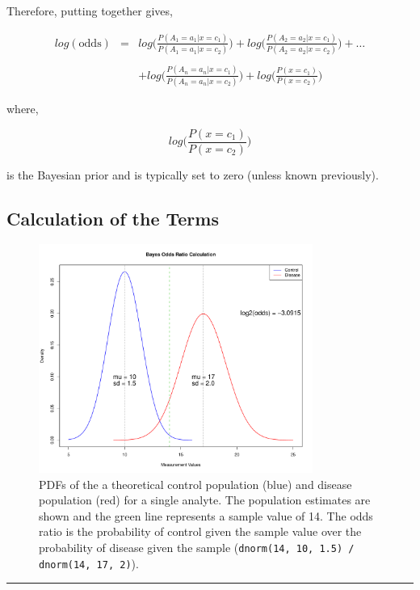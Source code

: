 \documentclass[12pt]{article}
\newcommand{\code}[1]{\texttt{#1}}                      %
\begin{document}
\newpage

Therefore, putting together gives,

\begin{eqnarray*}
	log(\text{odds}) &=& log\Bigg(\frac{P(A_1=a_1|x=c_1)}{P(A_1=a_1|x=c_2)}\Bigg) + 
			log\Bigg(\frac{P(A_2=a_2|x=c_1)}{P(A_2=a_2|x=c_2)}\Bigg) + \dots \\ \\
			&& + log\Bigg(\frac{P(A_n=a_n|x=c_1)}{P(A_n=a_n|x=c_2)}\Bigg) + 
			log\bigg(\frac{P(x=c_1)}{P(x=c_2)}\bigg)
\end{eqnarray*}

where,

\begin{equation*}
			log\bigg(\frac{P(x=c_1)}{P(x=c_2)}\bigg)
\end{equation*}

is the Bayesian prior and is typically set to zero (unless known previously).

\subsection{Calculation of the Terms}

\begin{figure}[H]
	\centering
	\includegraphics[width=0.8\textwidth]{plots/bayes-distn.pdf}
  \caption{PDFs of the a theoretical control population (blue) and disease
  population (red) for a single analyte. The population estimates are shown
  and the green line represents a sample value of 14. The odds ratio is the
  probability of control given the sample value over the probability of
  disease given the sample (\code{dnorm(14, 10, 1.5) / dnorm(14, 17, 2)}).}
\end{figure}

\def \hzline{\rule[0mm]{\textwidth}{1pt}}
\vfill \noindent \hzline \\ 
\end{document}
